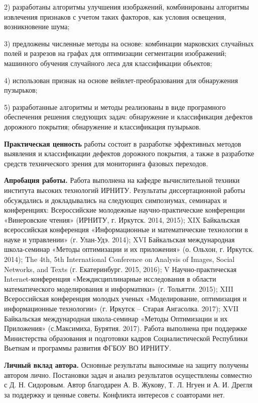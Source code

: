 2) разработаны алгоритмы улучшения изображений, комбинированы алгоритмы извлечения признаков с учетом таких факторов, как условия освещения, возникновение шума;

3) предложены численные методы на основе: комбинации марковских случайных полей и разрезов на графах для оптимизации сегментации изображений; машинного обучения случайного леса для классификации объектов;

4) использован признак на основе вейвлет-преобразования для обнаружения пузырьков;

5) разработанные алгоритмы и методы реализованы в виде програмного обеспечения решения следующих задач: обнаружение и классификация дефектов дорожного покрытия; обнаружение и классификация пузырьков.


\textbf{Практическая ценность} работы состоит в разработке эффективных методов выявления и классификации дефектов дорожного покрытия, а также в разработке средств технического зрения для мониторинга фазовых переходов.

\textbf{Апробация работы.} Работа выполнена на кафедре вычислительной техники института высоких технологий ИРНИТУ. Результаты диссертационной работы обсуждались и докладывались на следующих симпозиумах, семинарах и конференциях: Всероссийские молодежные научно-практические конференции «Винеровские чтения» (ИРНИТУ, г. Иркутск. 2014, 2015); XIX Байкальская всероссийская конференция «Информационные и математические технологии в науке и управлении» (г. Улан-Удэ. 2014); XVI Байкальская международная школа-семинар «Методы оптимизации и их приложения» (о. Ольхон, г. Иркутск. 2014); The 4th, 5th International Conference on Analysis of Images, Social Networks, and Texts (г. Екатеринбург. 2015, 2016); V Научно-практическая Internet-конференция «Междисциплинарные исследования в области математического моделирования и информатики» (г. Тольятти. 2015); XIII Всероссийская конференция молодых ученых «Моделирование, оптимизация и информационные технологии» (г. Иркутск – Старая Ангасолка. 2017); XVII Байкальская международная школа-семинар «Методы Оптимизации и их Приложения» (с.Максимиха, Бурятия. 2017). Работа выполнена при поддержке Министерства образования и подготовки кадров Социалистической Республики Вьетнам и программы развития ФГБОУ ВО ИРНИТУ.

\textbf{Личный вклад автора.} Основные результаты выносимые на защиту получены автором лично. Постановки задач и анализ результатов осуществлены совместно с Д. Н. Сидоровым. Автор благодарен А. В. Жукову, Т. Л. Нгуен и А. И. Дрегля за поддержку и ценные советы. Конфликта интересов с соавторами нет.

